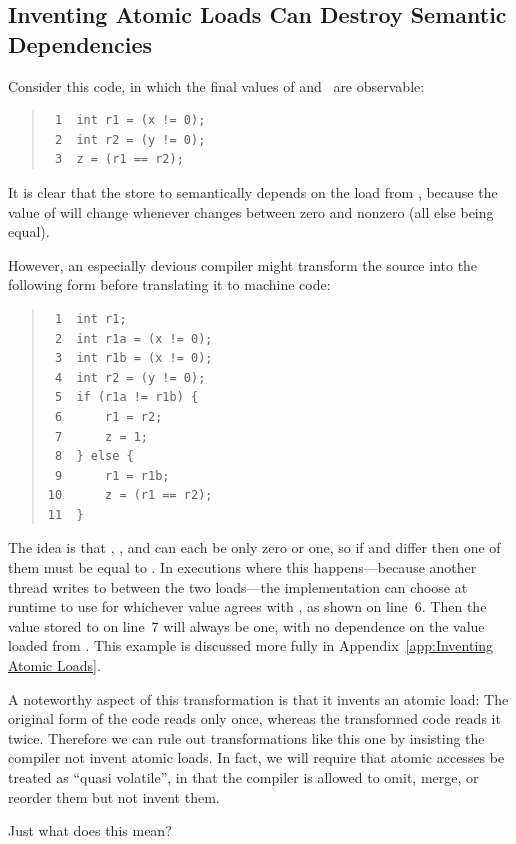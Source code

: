 \documentclass[10]{article}
\begin{document}
\subsection{Inventing Atomic Loads Can Destroy Semantic Dependencies}
\label{sec:Inventing Atomic Loads Can Destroy Semantic Dependencies}

Consider this code, in which the final values of  and~
are observable:
\begin{quote}
\begin{verbatim}
 1  int r1 = (x != 0);
 2  int r2 = (y != 0);
 3  z = (r1 == r2);
\end{verbatim}
\end{quote}
It is clear that the store to  semantically depends on the load
from , because the value of  will change whenever 
changes between zero and nonzero (all else being equal).

However, an especially devious compiler might transform the source into
the following form before translating it to machine code:
\begin{quote}
\begin{verbatim}
 1  int r1;
 2  int r1a = (x != 0);
 3  int r1b = (x != 0);
 4  int r2 = (y != 0);
 5  if (r1a != r1b) {
 6      r1 = r2;
 7      z = 1;
 8  } else {
 9      r1 = r1b;
10      z = (r1 == r2);
11  }
\end{verbatim}
\end{quote}
The idea is that , , and  can each be only zero or one,
so if  and  differ then one of them must be equal to .
In executions where this happens---because another thread writes to 
between the two loads---the implementation can choose at runtime to use
for  whichever value agrees with , as shown on line~6.
Then the value stored to  on line~7 will always be one,
with no dependence on the value loaded from .
This example is discussed more fully in
Appendix~\ref{app:Inventing Atomic Loads}.

A noteworthy aspect of this transformation is that it invents an atomic load:
The original form of the code reads  only once,
whereas the transformed code reads it twice.
Therefore we can rule out transformations like this one by insisting
the compiler not invent atomic loads.
In fact, we will require that atomic accesses be treated as
``quasi volatile'', in that the compiler is allowed to omit,
merge, or reorder them but not invent them.

Just what does this mean?
\end{document}
